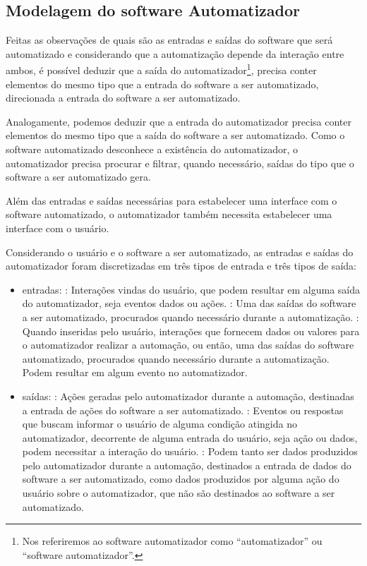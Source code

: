 \documentclass[tg]{mdtufsm}
\begin{document}
            \subsection{Modelagem do software Automatizador}

                Feitas as observações de quais são as entradas e saídas do software que será automatizado e considerando que a automatização depende da interação entre ambos, é possível deduzir que a saída do automatizador\footnote{ Nos referiremos ao software automatizador como “automatizador” ou “software automatizador”.}, precisa conter elementos do mesmo tipo que a entrada do software a ser automatizado, direcionada a entrada do software a ser automatizado.

                Analogamente, podemos deduzir que a entrada do automatizador precisa conter elementos do mesmo tipo que a saída do software a ser automatizado. Como o software automatizado desconhece a existência do automatizador, o automatizador precisa procurar e filtrar, quando necessário, saídas do tipo que o software a ser automatizado gera.

                Além das entradas e saídas necessárias para estabelecer uma interface com o software automatizado, o automatizador também necessita estabelecer uma interface com o usuário.

                Considerando o usuário e o software a ser automatizado, as entradas e saídas do automatizador foram discretizadas em três tipos de entrada e três tipos de saída:

                \begin{itemize}
                    \item entradas:
                        : Interações vindas do usuário, que podem resultar em alguma saída do automatizador, seja eventos dados ou ações.
                        : Uma das saídas do software a ser automatizado, procurados quando necessário durante a automatização.
                        : Quando inseridas pelo usuário, interações que fornecem dados ou valores para o automatizador realizar a automação, ou então, uma das saídas do software automatizado, procurados quando necessário durante a automatização. Podem resultar em algum evento no automatizador.
                    \item saídas:
                        : Ações geradas pelo automatizador durante a automação, destinadas a entrada de ações do software a ser automatizado.
                        : Eventos ou respostas que buscam informar o usuário de alguma condição atingida no automatizador, decorrente de alguma entrada do usuário, seja ação ou dados, podem necessitar a interação do usuário.
                        : Podem tanto ser dados produzidos pelo automatizador durante a automação, destinados a entrada de dados do software a ser automatizado, como dados produzidos por alguma ação do usuário sobre o automatizador, que não são destinados ao software a ser automatizado.
                \end{itemize}
\end{document}
